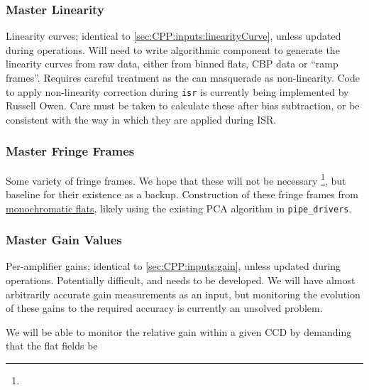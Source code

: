 \subsubsection{Master Linearity}\label{sec:CPP:output:linearityCurve}
Linearity curves; identical to \secsymbol\ref{sec:CPP:inputs:linearityCurve}, unless updated during operations.
\alg Will need to write algorithmic component to generate the linearity curves from raw data, either from binned flats, CBP data or ``ramp frames''. Requires careful treatment as the \bfeffect can masquerade as non-linearity. Code to apply non-linearity correction during \texttt{isr} is currently being implemented by Russell Owen. Care must be taken to calculate these after bias subtraction, or be consistent with the way in which they are applied during ISR.


\subsubsection{Master Fringe Frames}\label{sec:CPP:output:fringeFrames}
Some variety of fringe frames. We hope that these will not be necessary \footnote{}, but baseline for their existence as a backup.
\alg Construction of these fringe frames from \hyperref[sec:CPP:output:monoFlat]{monochromatic flats}, likely using the existing PCA algorithm in \texttt{pipe\_drivers}.


\subsubsection{Master Gain Values}\label{sec:CPP:output:gains}
Per-amplifier gains; identical to \secsymbol\ref{sec:CPP:inputs:gain}, unless updated during operations.
\alg Potentially difficult, and needs to be developed. We will have almost arbitrarily accurate gain measurements as an input, but monitoring the evolution of these gains to the required accuracy is currently an unsolved problem.

We will be able to monitor the relative gain within a given CCD by demanding that the flat fields be



